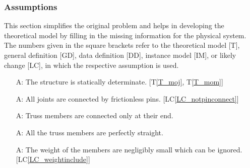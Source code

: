 \documentclass[12pt]{article}
\newcommand{\tref}[1]{T\ref{#1}}
\newcounter{assumpnum} %
\newcommand{\lcref}[1]{LC\ref{#1}}
\begin{document}
\subsubsection{Assumptions} \label{sec_assumpt}

This section simplifies the original problem and helps in developing the
theoretical model by filling in the missing information for the physical
system. The numbers given in the square brackets refer to the theoretical model
[T], general definition [GD], data definition [DD], instance model [IM], or
likely change [LC], in which the respective assumption is used.

\begin{itemize}
	
\item[A\refstepcounter{assumpnum}\theassumpnum \label{A_static}:]
 The structure is statically determinate. [\tref{T_moj}, \tref{T_mom}]
 
\end{itemize}

\begin{itemize}
	
	\item[A\refstepcounter{assumpnum}\theassumpnum \label{A_frictionless}:]
	All joints are connected by frictionless pins. [\lcref{LC_notpinconnect}]
	
\end{itemize}

\begin{itemize}
	
	\item[A\refstepcounter{assumpnum}\theassumpnum \label{A_connectatend}:]
	Truss members are connected only at their end. 
	
\end{itemize}

\begin{itemize}
	
	\item[A\refstepcounter{assumpnum}\theassumpnum \label{A_straight}:]
	All the truss members are perfectly straight. 
	
\end{itemize}

\begin{itemize}
	
	\item[A\refstepcounter{assumpnum}\theassumpnum \label{A_weightig}:]
	The weight of the members are negligibly small which can be ignored. 
	[\lcref{LC_weightinclude}]
	
\end{itemize}
\end{document}

